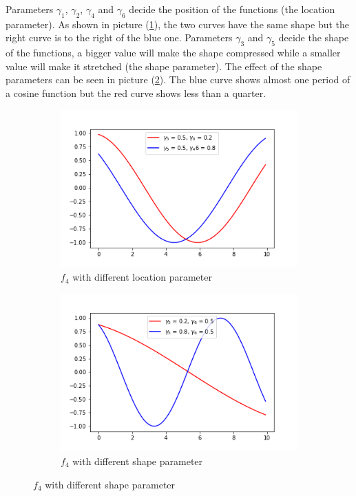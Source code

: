 \documentclass[a4paper,12pt,times,numbered,print,index]{report}
\numberwithin{equation}{section}
\begin{document}
Parameters $\gamma_{1}$, $\gamma_{2}$, $\gamma_{4}$ and $\gamma_{6}$ decide the position of the functions (the location parameter). As shown in picture (\ref{param_g6}), the two curves have the same shape but the right curve is to the right of the blue one. Parameters $\gamma_{3}$ and $\gamma_{5}$ decide the shape of the functions, a bigger value will make the shape compressed while a smaller value will make it stretched (the shape parameter). The effect of the shape parameters can be seen in picture (\ref{param_g5}). The blue curve shows almost one period of a cosine function but the red curve shows less than a quarter.

\begin{figure}[!htbp]
	\centering
	\caption{Plots for Trigonometric Functions}
	\begin{subfigure}[b]{0.44\linewidth}
		\includegraphics[width=\linewidth]{plots/scale_cos_g6.png}
		\caption{$f_{4}$ with different location parameter}
		\label{param_g6}
	\end{subfigure}
	\begin{subfigure}[b]{0.44\linewidth}
		\includegraphics[width=\linewidth]{plots/scale_cos_g5.png}
		\caption{$f_{4}$ with different shape parameter}
		\label{param_g5}
	\end{subfigure}
	\label{trigo}
\end{figure}
\end{document}
